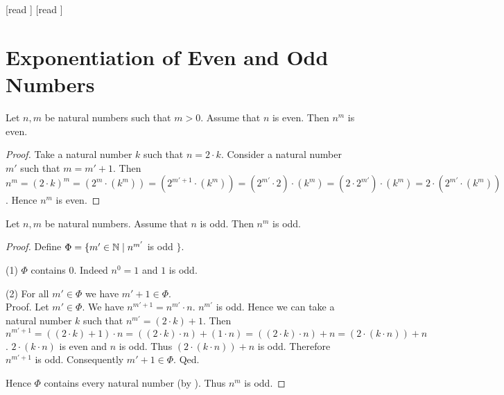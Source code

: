 \documentclass[10pt]{article}
\begin{document}
  \begin{imports}
    \begin{forthel}
      [read ]
      [read ]
    \end{forthel}
  \end{imports}


  \section*{Exponentiation of Even and Odd Numbers}

  \begin{forthel}
    \begin{proposition}[id=ARITHMETIC_15_1023659658745214,printid]
      Let $n, m$ be natural numbers such that $m > 0$.
      Assume that $n$ is even.
      Then $n^{m}$ is even.
    \end{proposition}
    \begin{proof}
      Take a natural number $k$ such that $n = 2 \cdot k$.
      Consider a natural number $m'$ such that $m = m' + 1$.
      Then $n^{m}
        = (2 \cdot k)^{m}
        = (2^{m} \cdot (k^{m}))
        = (2^{m' + 1} \cdot (k^{m}))
        = (2^{m'} \cdot 2) \cdot (k^{m})
        = (2 \cdot 2^{m'}) \cdot (k^{m})
        = 2 \cdot (2^{m'} \cdot (k^{m}))$.
      Hence $n^{m}$ is even.
    \end{proof}
  \end{forthel}

  \begin{forthel}
    \begin{proposition}[id=ARITHMETIC_15_0021200236556985,printid]
      Let $n, m$ be natural numbers.
      Assume that $n$ is odd.
      Then $n^{m}$ is odd.
    \end{proposition}
    \begin{proof}
      Define $\Phi = \{ m' \in \mathbb{N} \mid n^{m'}$ is odd $\}$.

      (1) $\Phi$ contains $0$.
      Indeed $n^{0} = 1$ and $1$ is odd.

      (2) For all $m' \in \Phi$ we have $m' + 1 \in \Phi$. \\
      Proof.
        Let $m' \in \Phi$.
        We have $n^{m' + 1} = n^{m'} \cdot n$.
        $n^{m'}$ is odd.
        Hence we can take a natural number $k$ such that $n^{m'} = (2 \cdot k) + 1$.
        Then $n^{m' + 1}
          = ((2 \cdot k) + 1) \cdot n
          = ((2 \cdot k) \cdot n) + (1 \cdot n)
          = ((2 \cdot k) \cdot n) + n
          = (2 \cdot (k \cdot n)) + n$.
        $2 \cdot (k \cdot n)$ is even and $n$ is odd.
        Thus $(2 \cdot (k \cdot n)) + n$ is odd.
        Therefore $n^{m' + 1}$ is odd.
        Consequently $m' + 1 \in \Phi$.
      Qed.

      Hence $\Phi$ contains every natural number (by ).
      Thus $n^{m}$ is odd.
    \end{proof}
  \end{forthel}
\end{document}
